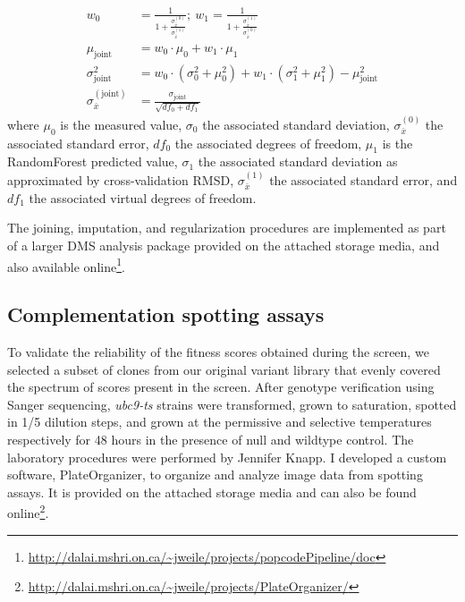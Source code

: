 \begin{align*}
w_0 &= \frac{1}{1+\frac{\sigma_{\bar x}^{(0)}}{\sigma_{\bar x}^{(1)}}}; ~ w_1 = \frac{1}{1+\frac{\sigma_{\bar x}^{(1)}}{\sigma_{\bar x}^{(0)}}}\\
\mu_\text{joint} &= w_0 \cdot \mu_0 + w_1 \cdot \mu_1\\
\sigma_\text{joint}^2 &= w_0 \cdot (\sigma_0^2 + \mu_0^2) + w_1 \cdot (\sigma_1^2 + \mu_1^2) - \mu_\text{joint}^2\\
\sigma_{\bar x}^{(\text{joint})} &= \frac{\sigma_\text{joint}}{\sqrt{df_0 + df_1}}
\end{align*}
where $\mu_0$ is the measured value, $\sigma_0$ the associated standard deviation, $\sigma_{\bar x}^{(0)}$ the associated standard error, $df_0$ the associated degrees of freedom, $\mu_1$ is the RandomForest predicted value, $\sigma_1$ the associated standard deviation as approximated by cross-validation RMSD, $\sigma_{\bar x}^{(1)}$ the associated standard error, and $df_1$ the associated virtual degrees of freedom.

The joining, imputation, and regularization procedures are implemented as part of a larger DMS analysis package provided on the attached storage media, and also available online\footnote{\url{http://dalai.mshri.on.ca/~jweile/projects/popcodePipeline/doc}}.

\subsection{Complementation spotting assays}
To validate the reliability of the fitness scores obtained during the screen, we selected a subset of clones from our original variant library that evenly covered the spectrum of scores present in the screen. After genotype verification using Sanger sequencing,  \textit{ubc9-ts} strains were transformed, grown to saturation, spotted in 1/5 dilution steps, and grown at the permissive and selective temperatures respectively for 48 hours in the presence of null and wildtype control. The laboratory procedures were performed by Jennifer Knapp. I developed a custom software, PlateOrganizer, to organize and analyze image data from spotting assays. It is provided on the attached storage media and can also be found online\footnote{\url{http://dalai.mshri.on.ca/~jweile/projects/PlateOrganizer/}}.

